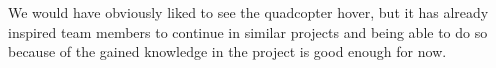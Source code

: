 \documentclass{article}
\begin{document}
We would have obviously liked to see the quadcopter hover, but it has already inspired team members to continue in similar projects and being able to do so because of the gained knowledge in the project is good enough for now. 



%






\end{document}
